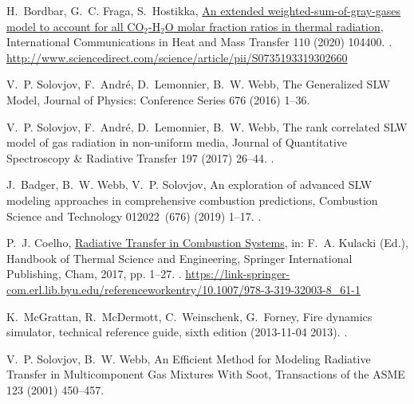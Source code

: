 \documentclass[preprint,12pt]{elsarticle}
\begin{document}
\begin{thebibliography}{10}
H.~Bordbar, G.~C. Fraga, S.~Hostikka,
\href{http://www.sciencedirect.com/science/article/pii/S0735193319302660}{{An
extended weighted-sum-of-gray-gases model to account for all {CO$_2$-H$_2$O}
molar fraction ratios in thermal radiation}}, {International Communications
in Heat and Mass Transfer} 110 (2020) 104400.
\newblock \href {http://dx.doi.org/10.1016/j.icheatmasstransfer.2019.104400}
  {}.
\newline\urlprefix\url{http://www.sciencedirect.com/science/article/pii/S0735193319302660}

V.~P. Solovjov, F.~Andr{\'e}, D.~Lemonnier, B.~W. Webb, {The Generalized {SLW}
Model}, {Journal of Physics: Conference Series} 676 (2016) 1--36.

V.~P. Solovjov, F.~Andr{\'e}, D.~Lemonnier, B.~W. Webb, {The rank correlated
{SLW} model of gas radiation in non-uniform media}, {Journal of Quantitative
Spectroscopy {\&} Radiative Transfer} 197 (2017) 26--44.
\newblock \href {http://dx.doi.org/10.1016/j.jqsrt.2017.01.034}
  {}.

J.~Badger, B.~W. Webb, V.~P. Solovjov, {An exploration of advanced {SLW}
modeling approaches in comprehensive combustion predictions}, {Combustion
Science and Technology} 012022~(676) (2019) 1--17.
\newblock \href {http://dx.doi.org/10.1080/00102202.2019.1678907}
  {}.

P.~J. Coelho,
\href{https://link-springer-com.erl.lib.byu.edu/referenceworkentry/10.1007/978-3-319-32003-8_61-1}{{Radiative
Transfer in Combustion Systems}}, in: F.~A. Kulacki (Ed.), {Handbook of
Thermal Science and Engineering}, {Springer International Publishing}, Cham,
2017, pp. 1--27.
\newblock \href {http://dx.doi.org/10.1007/978-3-319-32003-8{\textunderscore
  }61-1} {}.
\newline\urlprefix\url{https://link-springer-com.erl.lib.byu.edu/referenceworkentry/10.1007/978-3-319-32003-8_61-1}

K.~McGrattan, R.~McDermott, C.~Weinschenk, G.~Forney, Fire dynamics simulator,
technical reference guide, sixth edition (2013-11-04 2013).
\newblock \href {http://dx.doi.org/https://doi.org/10.6028/NIST.sp.1018}
  {}.

V.~P. Solovjov, B.~W. Webb, {An Efficient Method for Modeling Radiative
Transfer in Multicomponent Gas Mixtures With Soot}, {Transactions of the
ASME} 123 (2001) 450--457.


\end{thebibliography}
\end{document}
